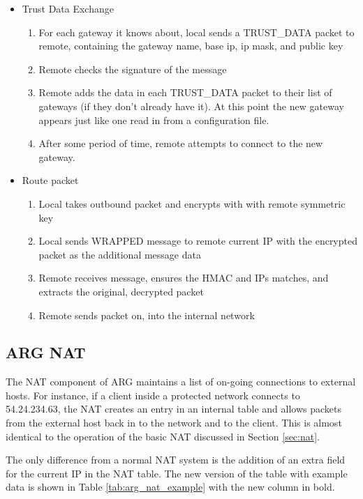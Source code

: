 \begin{itemize}
\item Trust Data Exchange
	\begin{enumerate}
		\item For each gateway it knows about, local sends a TRUST\_DATA packet to remote, containing the gateway name, base ip, ip mask, and public key
		\item Remote checks the signature of the message
		\item Remote adds the data in each TRUST\_DATA packet to their list of gateways (if they don't already have it). At this point the new gateway appears just like one read in from a configuration file.
		\item After some period of time, remote attempts to connect to the new gateway.
	 \end{enumerate}

\item Route packet
	 \begin{enumerate}
		 \item Local takes outbound packet and encrypts with with remote symmetric key
		 \item Local sends WRAPPED message to remote current IP with the encrypted packet as the additional message data
		 \item Remote receives message, ensures the HMAC and IPs matches, and extracts the original, decrypted packet
		 \item Remote sends packet on, into the internal network
	 \end{enumerate}
\end{itemize}

\subsection{\ac{ARG} \ac{NAT}}
\label{sec:arg_nat}
\par The \ac{NAT} component of \ac{ARG} maintains a list of on-going connections to external hosts. For instance, if a client inside a protected network connects to 54.24.234.63, the \ac{NAT} creates an entry in an internal table and allows packets from the external host back in to the network and to the client. This is almost identical to the operation of the basic \ac{NAT} discussed in Section \ref{sec:nat}.

\par The only difference from a normal \ac{NAT} system is the addition of an extra field for the current \ac{IP} in the \ac{NAT} table. The new version of the table with example data is shown in Table \ref{tab:arg_nat_example} with the new column in bold.

